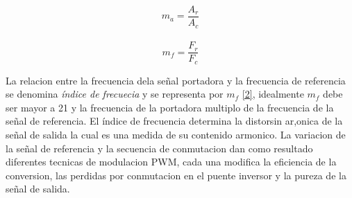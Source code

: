\documentclass[10pt,a4paper]{article}
\begin{document}
\begin{equation}
m_a=\frac{A_r}{A_c}
\label{1}
\end{equation}\\

\begin{equation}
 m_f=\frac{F_r}{F_c}
\label{2}
 \end{equation}



La relacion entre la frecuencia dela señal portadora y la frecuencia de referencia  se  denomina  \textit {\'indice de frecuecia} y se representa por $m_f$ \ref{2}, idealmente $m_f$ debe ser mayor a 21  y  la  frecuencia  de  la  portadora multiplo de la frecuencia de la señal de referencia. El \'indice de frecuencia determina la distorsin ar,onica de la señal de salida la cual es una medida de su  contenido  armonico. La variacion de la señal de referencia y la  secuencia  de  conmutacion dan como  resultado  diferentes  tecnicas de modulacion PWM, cada una modifica la eficiencia de la conversion,  las  perdidas  por  conmutacion en el puente inversor y la pureza de la señal de salida.
\end{document}
